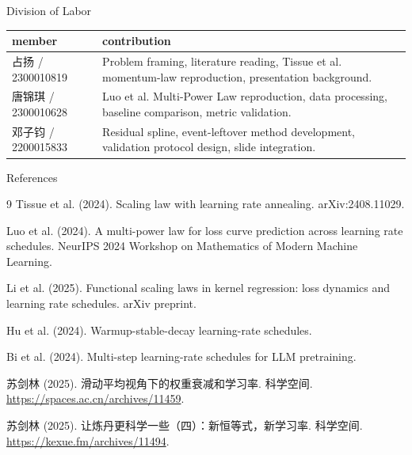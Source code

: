 \documentclass[fontset=fandol,aspectratio=169,10pt]{ctexbeamer}
\newcommand{\MemberA}{占扬 / 2300010819}
\newcommand{\MemberB}{唐锦琪 / 2300010628}
\newcommand{\MemberC}{邓子钧 / 2200015833}
\begin{document}
\begin{frame}{Division of Labor}
  \begin{table}
    \centering
    \scriptsize
    \begin{tabularx}{0.96\textwidth}{lX}
      \toprule
      member & contribution\\
      \midrule
      \MemberA & Problem framing, literature reading, Tissue et al. momentum-law reproduction, presentation background.\\
      \MemberB & Luo et al. Multi-Power Law reproduction, data processing, baseline comparison, metric validation.\\
      \MemberC & Residual spline, event-leftover method development, validation protocol design, slide integration.\\
      \bottomrule
    \end{tabularx}
  \end{table}
\end{frame}

\begin{frame}{References}
  \scriptsize
  \begin{thebibliography}{9}
    Tissue et al. (2024).
    \newblock Scaling law with learning rate annealing.
    \newblock arXiv:2408.11029.

    Luo et al. (2024).
    \newblock A multi-power law for loss curve prediction across learning rate schedules.
    \newblock NeurIPS 2024 Workshop on Mathematics of Modern Machine Learning.

    Li et al. (2025).
    \newblock Functional scaling laws in kernel regression: loss dynamics and learning rate schedules.
    \newblock arXiv preprint.

    Hu et al. (2024).
    \newblock Warmup-stable-decay learning-rate schedules.

    Bi et al. (2024).
    \newblock Multi-step learning-rate schedules for LLM pretraining.

    苏剑林 (2025).
    \newblock 滑动平均视角下的权重衰减和学习率.
    \newblock 科学空间. \url{https://spaces.ac.cn/archives/11459}.

    苏剑林 (2025).
    \newblock 让炼丹更科学一些（四）：新恒等式，新学习率.
    \newblock 科学空间. \url{https://kexue.fm/archives/11494}.
  \end{thebibliography}
\end{frame}
\end{document}
